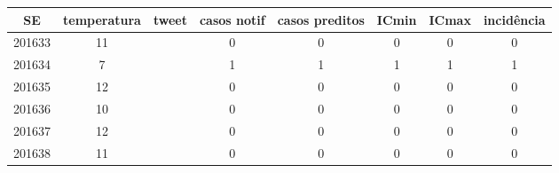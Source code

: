\begin{tabular}{c|ccccccc}
  \hline
SE & temperatura & tweet & casos notif & casos preditos & ICmin & ICmax & incidência \\ 
  \hline
201633 & 11 &  & 0 & 0 & 0 & 0 & 0 \\ 
  201634 & 7 &  & 1 & 1 & 1 & 1 & 1 \\ 
  201635 & 12 &  & 0 & 0 & 0 & 0 & 0 \\ 
  201636 & 10 &  & 0 & 0 & 0 & 0 & 0 \\ 
  201637 & 12 &  & 0 & 0 & 0 & 0 & 0 \\ 
  201638 & 11 &  & 0 & 0 & 0 & 0 & 0 \\ 
   \hline
\end{tabular}
